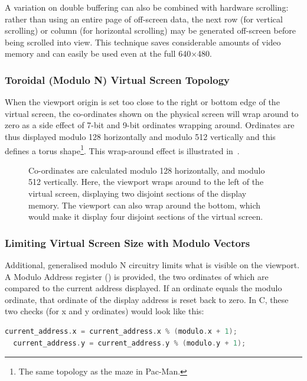 A variation on double buffering can also be combined with hardware scrolling:
rather than using an entire page of off-screen data, the next row (for vertical
scrolling) or column (for horizontal scrolling) may be generated off-screen
before being scrolled into view. This technique saves considerable amounts of
video memory and can easily be used even at the full 640×480.

\subsubsection{Toroidal (Modulo N) Virtual Screen Topology}

When the viewport origin is set too close to the right or bottom edge of the
virtual screen, the co-ordinates shown on the physical screen will wrap around
to zero as a side effect of 7-bit and 9-bit ordinates wrapping
around. Ordinates are thus displayed modulo 128 horizontally and modulo 512
vertically and this defines a torus shape\footnote{The same topology as the
  maze in Pac-Man.}. This wrap-around effect is illustrated
in~.

\begin{figure}
 \centering
 
 \caption[Toroidal Topology of the Virtual
   Screen]{\label{fig:vdu-virtual-screen-torus} Co-ordinates are calculated
   modulo 128 horizontally, and modulo 512 vertically. Here, the viewport wraps
   around to the left of the virtual screen, displaying two disjoint sections
   of the display memory. The viewport can also wrap around the bottom, which
   would make it display four disjoint sections of the virtual screen.}
\end{figure}



\subsubsection{Limiting Virtual Screen Size with Modulo Vectors}
\label{vdu:sec:modulo-address}
Additional, generalised modulo N circuitry limits what is visible on the
viewport. A Modulo Address register () is provided, the two
ordinates of which are compared to the current address displayed. If an
ordinate equals the modulo ordinate, that ordinate of the display address is
reset back to zero. In C, these two checks (for x and y ordinates) would look
like this:

\begin{lstlisting}[language=c]
  current_address.x = current_address.x % (modulo.x + 1);
  current_address.y = current_address.y % (modulo.y + 1);
\end{lstlisting}

